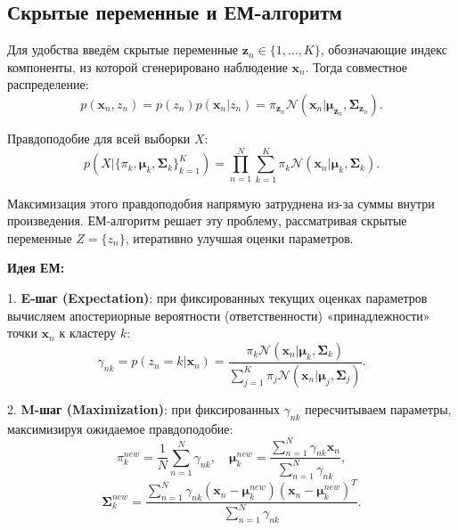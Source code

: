 \subsection{Скрытые переменные и ЕМ-алгоритм}

Для удобства введём скрытые переменные $\mathbf{z}_n \in \{1,\ldots,K\}$, обозначающие индекс компоненты, из которой сгенерировано наблюдение $\mathbf{x}_n$. Тогда совместное распределение:
\begin{equation*}
    p(\mathbf{x}_n, z_n) = p(z_n) p(\mathbf{x}_n | z_n) = \pi_{\mathbf{z}_n} \mathcal{N}(\mathbf{x}_n|\boldsymbol{\mu}_{\mathbf{z}_n}, \boldsymbol{\Sigma}_{\mathbf{z}_n}).
\end{equation*}

Правдоподобие для всей выборки $X$:
\begin{equation*}
    p(X|\{\pi_k,\boldsymbol{\mu}_k,\boldsymbol{\Sigma}_k\}_{k=1}^K) = \prod_{n=1}^N \sum_{k=1}^K \pi_k \mathcal{N}(\mathbf{x}_n|\boldsymbol{\mu}_k, \boldsymbol{\Sigma}_k).
\end{equation*}

Максимизация этого правдоподобия напрямую затруднена из-за суммы внутри произведения. ЕМ-алгоритм решает эту проблему, рассматривая скрытые переменные $Z=\{z_n\}$, итеративно улучшая оценки параметров.

\textbf{Идея ЕМ:}

1. \textbf{E-шаг (Expectation)}: при фиксированных текущих оценках параметров вычисляем апостериорные вероятности (ответственности) «принадлежности» точки $\mathbf{x}_n$ к кластеру $k$:
\begin{equation*}
    \gamma_{nk} = p(z_n = k|\mathbf{x}_n) = \frac{\pi_k \mathcal{N}(\mathbf{x}_n|\boldsymbol{\mu}_k,\boldsymbol{\Sigma}_k)}{\sum_{j=1}^K \pi_j \mathcal{N}(\mathbf{x}_n|\boldsymbol{\mu}_j,\boldsymbol{\Sigma}_j)}.
\end{equation*}

2. \textbf{M-шаг (Maximization)}: при фиксированных $\gamma_{nk}$ пересчитываем параметры, максимизируя ожидаемое правдоподобие:
\begin{equation*}
    \pi_k^{new} = \frac{1}{N}\sum_{n=1}^N \gamma_{nk}, \quad \boldsymbol{\mu}_k^{new} = \frac{\sum_{n=1}^N \gamma_{nk}\mathbf{x}_n}{\sum_{n=1}^N \gamma_{nk}},
\end{equation*}
\begin{equation*}
    \boldsymbol{\Sigma}_k^{new} = \frac{\sum_{n=1}^N \gamma_{nk}(\mathbf{x}_n - \boldsymbol{\mu}_k^{new})(\mathbf{x}_n - \boldsymbol{\mu}_k^{new})^T}{\sum_{n=1}^N \gamma_{nk}}.
\end{equation*}

